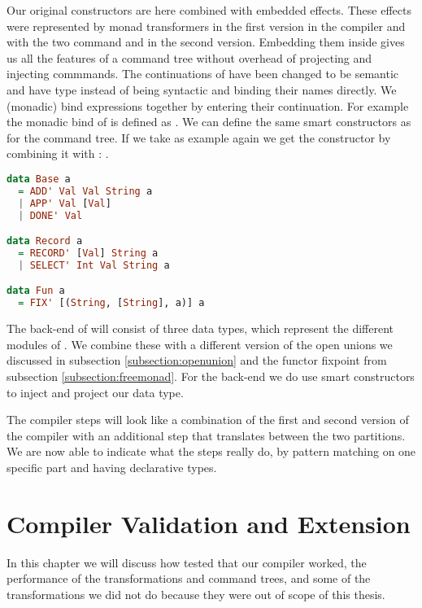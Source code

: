 Our original constructors are here combined with embedded effects. These effects were represented by monad transformers in the first version in the compiler and with the two command  and  in the second version. Embedding them inside gives us all the features of a command tree without overhead of projecting and injecting commmands. The continuations of  have been changed to be semantic and have type  instead of being syntactic and binding their names directly. We (monadic) bind expressions together by entering their continuation. For example the monadic bind of  is defined as . We can define the same smart constructors as for the command tree. If we take  as example again we get the constructor by combining it with : .

\begin{lstlisting}[language=Haskell]
data Base a
  = ADD' Val Val String a
  | APP' Val [Val]
  | DONE' Val

data Record a
  = RECORD' [Val] String a
  | SELECT' Int Val String a

data Fun a
  = FIX' [(String, [String], a)] a
\end{lstlisting}

The back-end of will consist of three data types, which represent the different modules of . We combine these with a different version of the open unions we discussed in subsection \ref{subsection:openunion} and the functor fixpoint  from subsection \ref{subsection:freemonad}. For the back-end we do use smart constructors to inject and project our data type.

The compiler steps will look like a combination of the first and second version of the compiler with an additional step that translates between the two  partitions. We are now able to indicate what the steps really do, by pattern matching on one specific part and having declarative types.

\section{Compiler Validation and Extension}
In this chapter we will discuss how tested that our compiler worked, the performance of the transformations and command trees, and some of the transformations we did not do because they were out of scope of this thesis.


